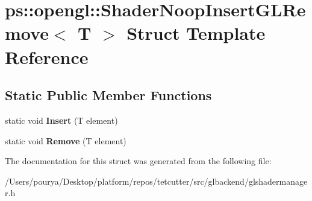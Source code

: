 \hypertarget{structps_1_1opengl_1_1ShaderNoopInsertGLRemove}{}\section{ps\+:\+:opengl\+:\+:Shader\+Noop\+Insert\+G\+L\+Remove$<$ T $>$ Struct Template Reference}
\label{structps_1_1opengl_1_1ShaderNoopInsertGLRemove}
\subsection*{Static Public Member Functions}
\begin{DoxyCompactItemize}
\item 
\hypertarget{structps_1_1opengl_1_1ShaderNoopInsertGLRemove_a5817e67ba205a26ab8c331f22840a4b0}{}static void {\bfseries Insert} (T element)\label{structps_1_1opengl_1_1ShaderNoopInsertGLRemove_a5817e67ba205a26ab8c331f22840a4b0}

\item 
\hypertarget{structps_1_1opengl_1_1ShaderNoopInsertGLRemove_a3e9c3dbcddc6170f6fd204336c07201b}{}static void {\bfseries Remove} (T element)\label{structps_1_1opengl_1_1ShaderNoopInsertGLRemove_a3e9c3dbcddc6170f6fd204336c07201b}

\end{DoxyCompactItemize}


The documentation for this struct was generated from the following file\+:\begin{DoxyCompactItemize}
\item 
/\+Users/pourya/\+Desktop/platform/repos/tetcutter/src/glbackend/glshadermanager.\+h\end{DoxyCompactItemize}

